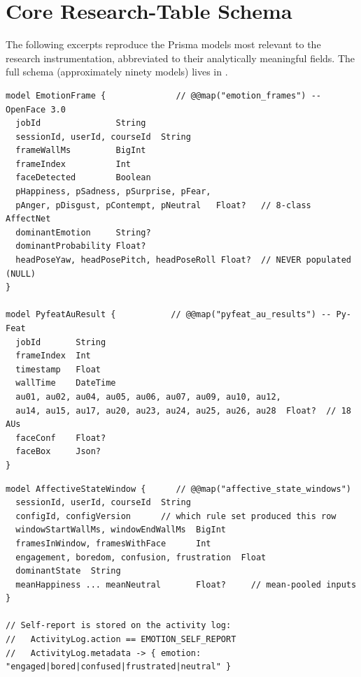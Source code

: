 
\chapter{Core Research-Table Schema}
\label{app:schema}

The following excerpts reproduce the Prisma models most relevant to the
research instrumentation, abbreviated to their analytically meaningful
fields. The full schema (approximately ninety models) lives in
.

\begin{lstlisting}[caption={Facial-analysis result tables.}]
model EmotionFrame {              // @@map("emotion_frames") -- OpenFace 3.0
  jobId               String
  sessionId, userId, courseId  String
  frameWallMs         BigInt
  frameIndex          Int
  faceDetected        Boolean
  pHappiness, pSadness, pSurprise, pFear,
  pAnger, pDisgust, pContempt, pNeutral   Float?   // 8-class AffectNet
  dominantEmotion     String?
  dominantProbability Float?
  headPoseYaw, headPosePitch, headPoseRoll Float?  // NEVER populated (NULL)
}

model PyfeatAuResult {           // @@map("pyfeat_au_results") -- Py-Feat
  jobId       String
  frameIndex  Int
  timestamp   Float
  wallTime    DateTime
  au01, au02, au04, au05, au06, au07, au09, au10, au12,
  au14, au15, au17, au20, au23, au24, au25, au26, au28  Float?  // 18 AUs
  faceConf    Float?
  faceBox     Json?
}
\end{lstlisting}

\begin{lstlisting}[caption={Affective-state windows and self-report basis.}]
model AffectiveStateWindow {      // @@map("affective_state_windows")
  sessionId, userId, courseId  String
  configId, configVersion      // which rule set produced this row
  windowStartWallMs, windowEndWallMs  BigInt
  framesInWindow, framesWithFace      Int
  engagement, boredom, confusion, frustration  Float
  dominantState  String
  meanHappiness ... meanNeutral       Float?     // mean-pooled inputs
}

// Self-report is stored on the activity log:
//   ActivityLog.action == EMOTION_SELF_REPORT
//   ActivityLog.metadata -> { emotion: "engaged|bored|confused|frustrated|neutral" }
\end{lstlisting}

